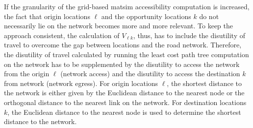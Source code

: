 If the granularity of the grid-based \gls{matsim} accessibility computation is increased, the fact that origin
locations $\ell$ and the opportunity locations $k$ do not necessarily lie on the network becomes more and more
relevant. To keep the approach consistent, the calculation of $V_{\ell k}$, thus, has to include the disutility
of travel to overcome the gap between locations and the road network. Therefore, the disutility of travel
calculated by running the least cost path tree computation on the network has to be supplemented by the
disutility to access the network from the origin $\ell$ (network access) and the disutility to access the
destination $k$ from network (network egress). For origin locations $\ell$, the shortest distance to the
network is either given by the Euclidean distance to the nearest node or the orthogonal distance to the
nearest link on the network.
For destination locations $k$, the Euclidean distance to the nearest node is used to determine
the shortest distance to the network.
%
%
%
%

